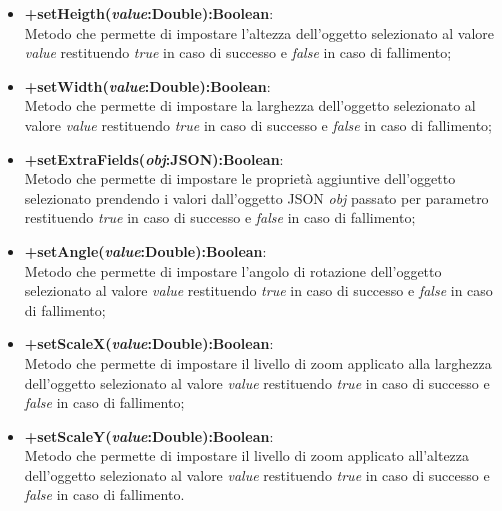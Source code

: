 \begin{itemize}
	\item \textbf{+setHeigth(\textit{value}:Double):Boolean}:\\
		Metodo che permette di impostare l'altezza dell'oggetto selezionato al valore \textit{value} restituendo \textit{true} in caso di successo e \textit{false} in caso di fallimento;
	\item \textbf{+setWidth(\textit{value}:Double):Boolean}:\\
		Metodo che permette di impostare la larghezza dell'oggetto selezionato al valore \textit{value} restituendo \textit{true} in caso di successo e \textit{false} in caso di fallimento;
	\item \textbf{+setExtraFields(\textit{obj}:JSON):Boolean}:\\
		Metodo che permette di impostare le proprietà aggiuntive dell'oggetto selezionato prendendo i valori dall'oggetto JSON \textit{obj} passato per parametro restituendo \textit{true} in caso di successo e \textit{false} in caso di fallimento;
	\item \textbf{+setAngle(\textit{value}:Double):Boolean}:\\
		Metodo che permette di impostare l'angolo di rotazione dell'oggetto selezionato al valore \textit{value} restituendo \textit{true} in caso di successo e \textit{false} in caso di fallimento;
	\item \textbf{+setScaleX(\textit{value}:Double):Boolean}:\\
		Metodo che permette di impostare il livello di zoom applicato alla larghezza dell'oggetto selezionato al valore \textit{value} restituendo \textit{true} in caso di successo e \textit{false} in caso di fallimento;
	\item \textbf{+setScaleY(\textit{value}:Double):Boolean}:\\
		Metodo che permette di impostare il livello di zoom applicato all'altezza dell'oggetto selezionato al valore \textit{value} restituendo \textit{true} in caso di successo e \textit{false} in caso di fallimento.
	\end{itemize}
